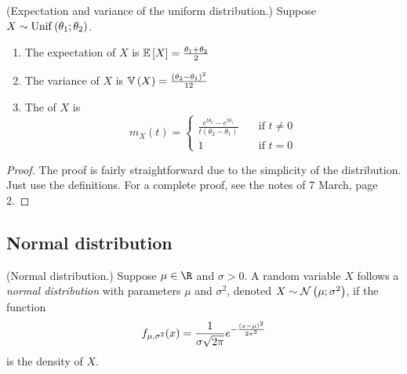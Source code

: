 \documentclass[11pt]{article}
\begin{document}
\begin{thm}{(Expectation and variance of the uniform distribution.)}
    Suppose $X \sim \operatorname{Unif}\left(\theta_1;\theta_2\right)$.
    \begin{enumerate}
        \item
            The expectation of $X$ is
            $\operatorname{\mathbb{E}}{\left[X\right]} = \frac{\theta_1 + \theta_2}{2}$
        \item
            The variance of $X$ is
            $\operatorname{\mathbb{V}}{\left(X\right)} = \frac{(\theta_2 - \theta_1)^2}{12}$
        \item
            The \mgf{} of $X$ is
            \begin{equation*}
                m_X(t) = \begin{cases}
                    \frac{
                        e^{t \theta_2} - e^{t \theta_1}
                    }{
                        t(\theta_2 - \theta_1)
                    }
                        &\quad\text{if } t \neq 0 \\
                    1
                        &\quad\text{if } t = 0
                \end{cases}
            \end{equation*}
    \end{enumerate}
\end{thm}

\begin{proof}
    The proof is fairly straightforward due to the simplicity of the
    distribution. Just use the definitions.
    For a complete proof, see the notes of 7 March, page 2.
\end{proof}

\subsection{Normal distribution}
\label{sec:normal-distribution}

\begin{defn}{(Normal distribution.)}
    \label{def:normal-distribution}
    Suppose $\mu \in \R$ and $\sigma > 0$.
    A random variable $X$ follows a \emph{normal distribution} with parameters
    $\mu$ and $\sigma^2$,
    denoted $X \sim \operatorname{\mathcal{N}}\left(\mu;\sigma^2\right)$,
    if the function
    \begin{equation}
        \label{eq:normal-density}
        f_{\mu,\sigma^2} (x)
        =
        \frac{1}{\sigma \sqrt{2 \pi}}
        e^{
            -\frac{\left(x - \mu\right)^2}{2 \sigma^2}
        }
    \end{equation}
    is the density of $X$.
\end{defn}
\end{document}
